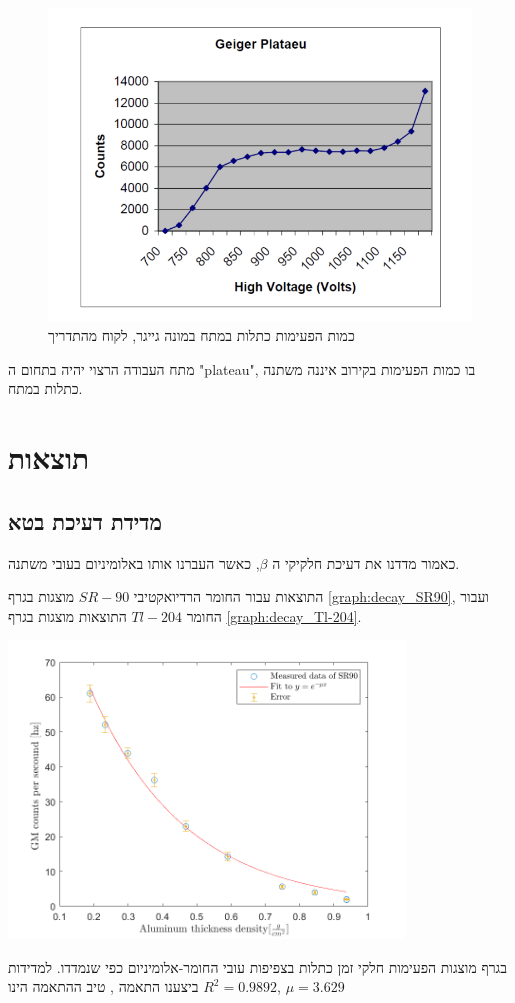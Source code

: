 \documentclass{article}
\begin{document}
\begin{figure}[ht!]
    \centering
    \includegraphics{plateau.png}
    \caption{כמות הפעימות כתלות במתח במונה גייגר, לקוח מהתדריך}
    \label{fig:plateau}
\end{figure}

מתח העבודה הרצוי יהיה בתחום ה
\textenglish{"plateau"},
בו כמות הפעימות בקירוב איננה משתנה כתלות במתח.

\section{
תוצאות
}

\subsection{
מדידת דעיכת בטא
}

כאמור מדדנו את דעיכת חלקיקי ה
$\beta$,
כאשר העברנו אותו באלומיניום בעובי משתנה.

התוצאות עבור החומר הרדיואקטיבי
$SR-90$
מוצגות בגרף 
\ref{graph:decay_SR90},
ועבור החומר
$Tl-204$
התוצאות מוצגות בגרף
\ref{graph:decay_Tl-204}.


\begin{graph}[ht!]
    \centering
    \includegraphics[width=0.79\textwidth]{SR90.png}
    \caption{
    }
    \label{graph:decay_SR90}
\end{graph}
 בגרף מוצגות הפעימות חלקי זמן כתלות בצפיפות עובי החומר-אלומיניום כפי שנמדדו.
 למדידות ביצענו התאמה ,
 טיב ההתאמה הינו 
 $R^2 = 0.9892$,
 $\mu = 3.629$
 
\end{document}
